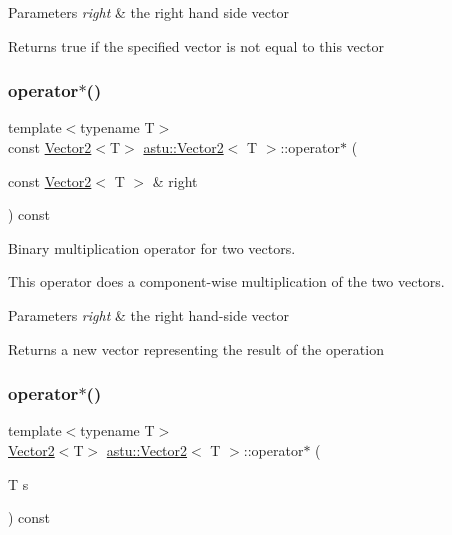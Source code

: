 \begin{DoxyParams}{Parameters}
{\em right} & the right hand side vector \\
\hline
\end{DoxyParams}
\begin{DoxyReturn}{Returns}
{\ttfamily true} if the specified vector is not equal to this vector 
\end{DoxyReturn}
\mbox{\label{classastu_1_1Vector2_a5ee8479488e6da2a82110f2ac62d386f}} 
\subsubsection{\texorpdfstring{operator$\ast$()}{operator*()}\hspace{0.1cm}{\footnotesize\ttfamily [1/2]}}
{\footnotesize\ttfamily template$<$typename T$>$ \\
const \hyperlink{classastu_1_1Vector2}{Vector2}$<$T$>$ \hyperlink{classastu_1_1Vector2}{astu\+::\+Vector2}$<$ T $>$\+::operator$\ast$ (\begin{DoxyParamCaption}\item[{const \hyperlink{classastu_1_1Vector2}{Vector2}$<$ T $>$ \&}]{right }\end{DoxyParamCaption}) const\hspace{0.3cm}{\ttfamily [inline]}}

Binary multiplication operator for two vectors.

This operator does a component-\/wise multiplication of the two vectors.


\begin{DoxyParams}{Parameters}
{\em right} & the right hand-\/side vector \\
\hline
\end{DoxyParams}
\begin{DoxyReturn}{Returns}
a new vector representing the result of the operation 
\end{DoxyReturn}
\mbox{\label{classastu_1_1Vector2_aa9cd4d74e0174cb0995613f989e42f12}} 
\subsubsection{\texorpdfstring{operator$\ast$()}{operator*()}\hspace{0.1cm}{\footnotesize\ttfamily [2/2]}}
{\footnotesize\ttfamily template$<$typename T$>$ \\
\hyperlink{classastu_1_1Vector2}{Vector2}$<$T$>$ \hyperlink{classastu_1_1Vector2}{astu\+::\+Vector2}$<$ T $>$\+::operator$\ast$ (\begin{DoxyParamCaption}\item[{T}]{s }\end{DoxyParamCaption}) const\hspace{0.3cm}{\ttfamily [inline]}}

